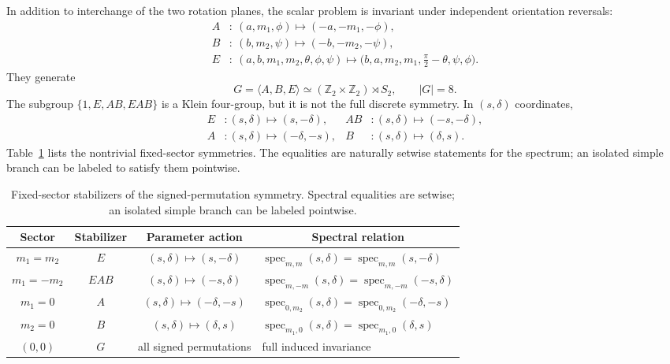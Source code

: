 \documentclass[10pt]{article}
\newcommand{\thead}[1]{\multicolumn{1}{c}{#1}}
\theoremstyle{plain}
\DeclareMathOperator{\spec}{spec}
\begin{document}
In addition to interchange of the two rotation planes, the scalar problem is
invariant under independent orientation reversals:
\begin{align}
A&:\ (a,m_1,\phi)\mapsto(-a,-m_1,-\phi),\\
B&:\ (b,m_2,\psi)\mapsto(-b,-m_2,-\psi),\\
E&:\ (a,b,m_1,m_2,\theta,\phi,\psi)\mapsto
   \bigl(b,a,m_2,m_1,\tfrac{\pi}{2}-\theta,\psi,\phi\bigr).
\end{align}
They generate
\begin{equation}
G=\langle A,B,E\rangle\simeq(\mathbb{Z}_2\times\mathbb{Z}_2)\rtimes S_2,
\qquad |G|=8.
\end{equation}
The subgroup $\{1,E,AB,EAB\}$ is a Klein four-group, but it is not the full
discrete symmetry. In $(s,\delta)$ coordinates,
\begin{align}
E&:(s,\delta)\mapsto(s,-\delta), & AB&:(s,\delta)\mapsto(-s,-\delta),\\
A&:(s,\delta)\mapsto(-\delta,-s), & B&:(s,\delta)\mapsto(\delta,s).
\end{align}
Table~\ref{tab:stabilizers} lists the nontrivial fixed-sector symmetries. The
equalities are naturally setwise statements for the spectrum; an isolated simple
branch can be labeled to satisfy them pointwise.

\begin{table}[t]
\centering
\caption{Fixed-sector stabilizers of the signed-permutation symmetry. Spectral
equalities are setwise; an isolated simple branch can be labeled pointwise.}
\label{tab:stabilizers}
\begin{tabular}{cccl}
\toprule
\thead{Sector} & \thead{Stabilizer} & \thead{Parameter action} &
\thead{Spectral relation} \\
\midrule
$m_1=m_2$  & $E$    & $(s,\delta)\mapsto(s,-\delta)$
           & $\spec_{m,m}(s,\delta)=\spec_{m,m}(s,-\delta)$ \\
$m_1=-m_2$ & $EAB$  & $(s,\delta)\mapsto(-s,\delta)$
           & $\spec_{m,-m}(s,\delta)=\spec_{m,-m}(-s,\delta)$ \\
$m_1=0$    & $A$    & $(s,\delta)\mapsto(-\delta,-s)$
           & $\spec_{0,m_2}(s,\delta)=\spec_{0,m_2}(-\delta,-s)$ \\
$m_2=0$    & $B$    & $(s,\delta)\mapsto(\delta,s)$
           & $\spec_{m_1,0}(s,\delta)=\spec_{m_1,0}(\delta,s)$ \\
$(0,0)$    & $G$    & all signed permutations
           & full induced invariance \\
\bottomrule
\end{tabular}
\end{table}
\end{document}
